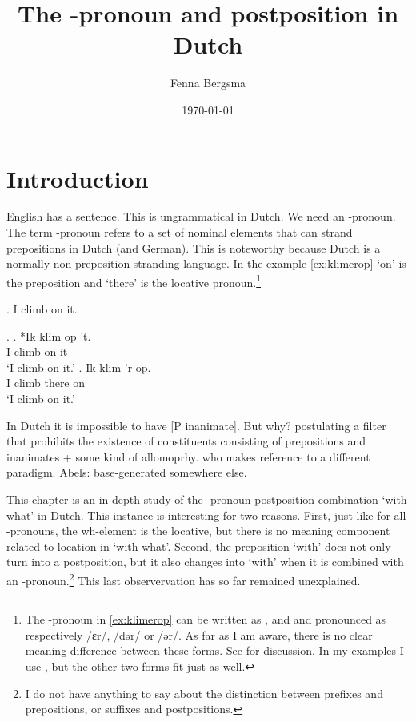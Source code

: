 \documentclass[12pt]{article}
\title{The \tsc{r}-pronoun and postposition \tit{waarmee} in Dutch}
\author{Fenna Bergsma}
\date{\today}
\begin{document}
\maketitle



\section{Introduction}

English has a sentence. This is ungrammatical in Dutch. We need an -pronoun. The term -pronoun \citep{riemsdijk1978} refers to a set of nominal elements that can strand prepositions in Dutch (and German). This is noteworthy because Dutch is a normally non-preposition stranding language.
In the example \ref{ex:klimerop}  `on' is the preposition and  `there' is the locative pronoun.\footnote{The -pronoun  in \ref{ex:klimerop} can be written as ,  and  and pronounced as respectively /ɛr/, /dər/ or /ər/. As far as I am aware, there is no clear meaning difference between these forms. See \citet{wesseling2018} for discussion. In my examples I use , but the other two forms fit just as well.}

\ex. I climb on it.

\ex.
\ag. *Ik klim op 't.\\
 I climb on it\\
 `I climb on it.'\label{ex:klimopt}
\bg. Ik klim 'r op.\\
 I climb there on\\
 `I climb on it.'\label{ex:klimerop}

In Dutch it is impossible to have [P inanimate]. But why? \citet{riemsdijk1978} postulating a filter that prohibits the existence of constituents consisting of prepositions and inanimates + some kind of allomoprhy. \citet{koopman2000} who makes reference to a different paradigm. Abels: base-generated somewhere else.

This chapter is an in-depth study of the -pronoun-postposition combination  `with what' in Dutch. This instance is interesting for two reasons. First, just like for all -pronouns, the wh-element is the locative, but there is no meaning component related to location in `with what'. Second, the preposition  `with' does not only turn into a postposition, but it also changes into  `with' when it is combined with an -pronoun.\footnote{I do not have anything to say about the distinction between prefixes and prepositions, or suffixes and postpositions.} This last observervation has so far remained unexplained.
\end{document}
